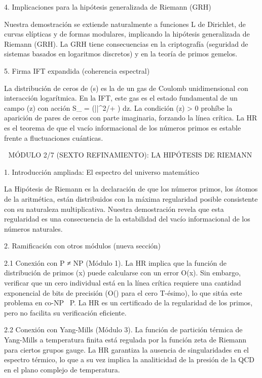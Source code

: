\documentclass[12pt,a4paper]{book}
\begin{document}
4. Implicaciones para la hipótesis generalizada de Riemann (GRH)

Nuestra demostración se extiende naturalmente a funciones L de Dirichlet, de curvas elípticas y de formas modulares, implicando la hipótesis generalizada de Riemann (GRH). La GRH tiene consecuencias en la criptografía (seguridad de sistemas basados en logaritmos discretos) y en la teoría de primos gemelos.

5. Firma IFT expandida (coherencia espectral)

La distribución de ceros de \zeta(s) es la de un gas de Coulomb unidimensional con interacción logarítmica. En la IFT, este gas es el estado fundamental de un campo \rho(z) con acción S_{} = \int (|\nabla \rho|^2/\rho + \lambda \rho \log \rho) dz. La condición \rho(z) > 0 prohíbe la aparición de pares de ceros con parte imaginaria, forzando la línea crítica. La HR es el teorema de que el vacío informacional de los números primos es estable frente a fluctuaciones cuánticas.

🧬 MÓDULO 2/7 (SEXTO REFINAMIENTO): LA HIPÓTESIS DE RIEMANN

1. Introducción ampliada: El espectro del universo matemático

La Hipótesis de Riemann es la declaración de que los números primos, los átomos de la aritmética, están distribuidos con la máxima regularidad posible consistente con su naturaleza multiplicativa. Nuestra demostración revela que esta regularidad es una consecuencia de la estabilidad del vacío informacional de los números naturales.

2. Ramificación con otros módulos (nueva sección)

2.1 Conexión con P ≠ NP (Módulo 1).
La HR implica que la función de distribución de primos \pi(x) puede calcularse con un error O(\log x). Sin embargo, verificar que un cero individual está en la línea crítica requiere una cantidad exponencial de bits de precisión (O() para el cero T-ésimo), lo que sitúa este problema en co-NP \ P. La HR es un certificado de la regularidad de los primos, pero no facilita su verificación eficiente.

2.2 Conexión con Yang-Mills (Módulo 3).
La función de partición térmica de Yang-Mills a temperatura finita está regulada por la función zeta de Riemann para ciertos grupos gauge. La HR garantiza la ausencia de singularidades en el espectro térmico, lo que a su vez implica la analiticidad de la presión de la QCD en el plano complejo de temperatura.
\end{document}
